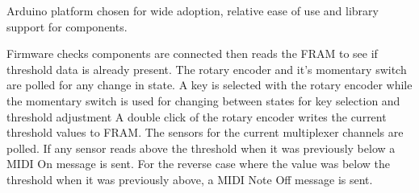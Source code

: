 Arduino platform chosen for wide adoption, relative ease of use and
library support for components.

Firmware checks components are connected then reads the FRAM to see if
threshold data is already present. The rotary encoder and it's momentary
switch are polled for any change in state. A key is selected with the
rotary encoder while the momentary switch is used for changing between
states for key selection and threshold adjustment A double click of the
rotary encoder writes the current threshold values to FRAM. The sensors
for the current multiplexer channels are polled. If any sensor reads
above the threshold when it was previously below a MIDI On message is
sent. For the reverse case where the value was below the threshold when
it was previously above, a MIDI Note Off message is sent.



% 






